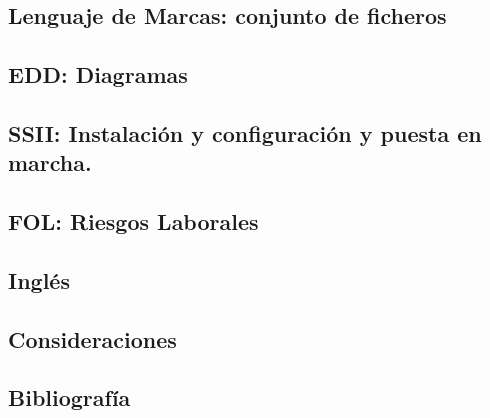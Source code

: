 \documentclass{article}
\begin{document}
\subsection{Lenguaje de Marcas: conjunto de ficheros}
\subsection{EDD: Diagramas}
\subsection{SSII: Instalación y configuración y puesta en marcha.}
\subsection{FOL: Riesgos Laborales}
\subsection{Inglés}
\subsection{Consideraciones}
\subsection{Bibliografía}
\end{document}
